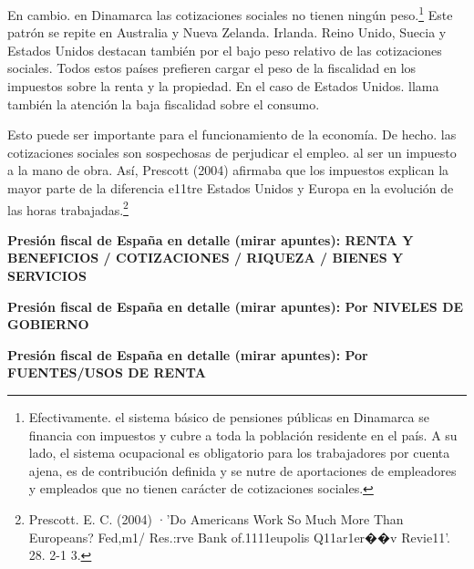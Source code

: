 \documentclass[10pt,a4paper]{article}
\begin{document}
En cambio. en Dinamarca las cotizaciones sociales no tienen ningún peso.\footnote{%
    Efectivamente. el sistema básico de pensiones públicas en Dinamarca se financia con impuestos y cubre a toda la población residente en el país. A su lado, el sistema ocupacional es obligatorio para los trabajadores por cuenta ajena, es de contribución definida y se nutre de aportaciones de empleadores y empleados que no tienen carácter de cotizaciones sociales.
} Este patrón se repite en Australia y Nueva Zelanda. Irlanda. Reino Unido, Suecia y Estados Unidos destacan también por el bajo peso relativo de las cotizaciones sociales. Todos estos países prefieren cargar el peso de la fiscalidad en los impuestos sobre la renta y la propiedad. En el caso de Estados Unidos. llama también la atención la baja fiscalidad sobre el consumo.

Esto puede ser importante para el funcionamiento de la economía. De hecho. las cotizaciones sociales son sospechosas de perjudicar el empleo. al ser un impuesto a la mano de obra. Así, Prescott (2004) afirmaba que los impuestos explican la mayor parte de la diferencia e11tre Estados Unidos y Europa en la evolución de las horas trabajadas.\footnote{%
    Prescott. E. C. (2004) ·'\Vhy Do Americans Work So Much More Than Europeans? Fed,m1/ Res.:rve Bank of.\fi1111eupolis Q11ar1er��v Revie11'. 28. 2-1 3.
}


\textbf{Presión fiscal de España en detalle (mirar apuntes): RENTA Y BENEFICIOS / COTIZACIONES / RIQUEZA / BIENES Y SERVICIOS}

\textbf{Presión fiscal de España en detalle (mirar apuntes): Por NIVELES DE GOBIERNO}

\textbf{Presión fiscal de España en detalle (mirar apuntes): Por FUENTES/USOS DE RENTA}
\end{document}
